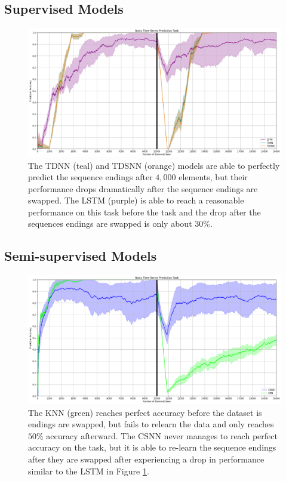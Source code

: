 \documentclass{article}
\begin{document}
\subsection*{Supervised Models}

\begin{figure}[H]
    \centering
    \includegraphics[width=\linewidth]{../results/artificial-supervised.png}
    \caption{The TDNN (teal) and TDSNN (orange) models are able to perfectly predict the sequence endings after $4,000$ elements, but their performance drops dramatically after the sequence endings are swapped. The LSTM (purple) is able to reach a reasonable performance on this task before the task and the drop after the sequences endings are swapped is only about $30\%$.}
    \label{fig:prediction-accuracy1}
\end{figure}

\subsection*{Semi-supervised Models}

\begin{figure}[H]
    \centering
    \includegraphics[width=\linewidth]{../results/artificial-unsupervised.png}
    \caption{The KNN (green) reaches perfect accuracy before the dataset is endings are swapped, but fails to relearn the data and only reaches $50\%$ accuracy afterward. The CSNN never manages to reach perfect accuracy on the task, but it is able to re-learn the sequence endings after they are swapped after experiencing a drop in performance similar to the LSTM in Figure \ref{fig:prediction-accuracy1}.}
    \label{fig:prediction-accuracy2}
\end{figure}
\end{document}
